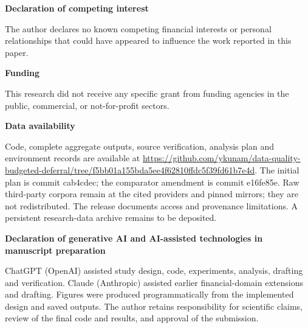 \documentclass[11pt,letterpaper]{article}
\begin{document}
\par\noindent\textbf{Declaration of competing interest}\par
The author declares no known competing financial interests or personal relationships that could have appeared to influence the work reported in this paper.

\par\noindent\textbf{Funding}\par
This research did not receive any specific grant from funding agencies in the public, commercial, or not-for-profit sectors.

\par\noindent\textbf{Data availability}\par
Code, complete aggregate outputs, source verification, analysis plan and environment records are available at \url{https://github.com/ykunam/data-quality-budgeted-deferral/tree/f5bb01a155bda5ee4f62810ffdc5f39fd61b7e4d}. The initial plan is commit cab4cdec; the comparator amendment is commit e16fe85e. Raw third-party corpora remain at the cited providers and pinned mirrors; they are not redistributed. The release documents access and provenance limitations. A persistent research-data archive remains to be deposited.

\par\noindent\textbf{Declaration of generative AI and AI-assisted technologies in manuscript preparation}\par
ChatGPT (OpenAI) assisted study design, code, experiments, analysis, drafting and verification. Claude (Anthropic) assisted earlier financial-domain extensions and drafting. Figures were produced programmatically from the implemented design and saved outputs. The author retains responsibility for scientific claims, review of the final code and results, and approval of the submission.
\end{document}
